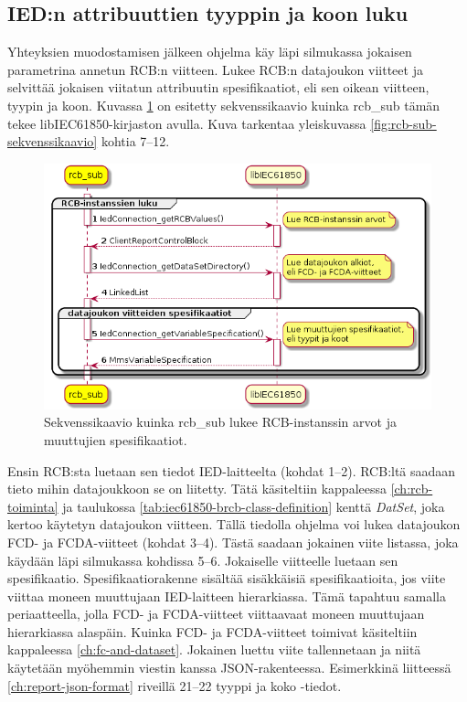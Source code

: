 \subsection{IED:n attribuuttien tyyppin ja koon luku}
Yhteyksien muodostamisen jälkeen ohjelma käy läpi silmukassa jokaisen parametrina annetun RCB:n viitteen. Lukee RCB:n datajoukon viitteet ja selvittää jokaisen viitatun attribuutin spesifikaatiot, eli sen oikean viitteen, tyypin ja koon. Kuvassa \ref{fig:rcb-sub-reading-specifications} on esitetty sekvenssikaavio kuinka rcb\_sub tämän tekee libIEC61850-kirjaston avulla. Kuva tarkentaa yleiskuvassa \ref{fig:rcb-sub-sekvenssikaavio} kohtia 7--12.

\begin{figure}[ht!]
	\includegraphics[width=1\textwidth]{pictures/rcb-sub-reading-specifications.png}
	\caption{Sekvenssikaavio kuinka rcb\_sub lukee RCB-instanssin arvot ja muuttujien spesifikaatiot.}
	\label{fig:rcb-sub-reading-specifications}
\end{figure}

Ensin RCB:sta luetaan sen tiedot IED-laitteelta (kohdat 1--2). RCB:ltä saadaan tieto mihin datajoukkoon se on liitetty. Tätä käsiteltiin kappaleessa \ref{ch:rcb-toiminta} ja taulukossa \ref{tab:iec61850-brcb-class-definition} kenttä \emph{DatSet}, joka kertoo käytetyn datajoukon viitteen. Tällä tiedolla ohjelma voi lukea datajoukon FCD- ja FCDA-viitteet (kohdat 3--4). Tästä saadaan jokainen viite listassa, joka käydään läpi silmukassa kohdissa 5--6. Jokaiselle viitteelle luetaan sen spesifikaatio. Spesifikaatiorakenne sisältää sisäkkäisiä spesifikaatioita, jos viite viittaa moneen muuttujaan IED-laitteen hierarkiassa. Tämä tapahtuu samalla periaatteella, jolla FCD- ja FCDA-viitteet viittaavaat moneen muuttujaan hierarkiassa alaspäin. Kuinka FCD- ja FCDA-viitteet toimivat käsiteltiin kappaleessa \ref{ch:fc-and-dataset}. Jokainen luettu viite tallennetaan ja niitä käytetään myöhemmin viestin kanssa JSON-rakenteessa. Esimerkkinä liitteessä \ref{ch:report-json-format} riveillä 21--22 tyyppi ja koko -tiedot.


